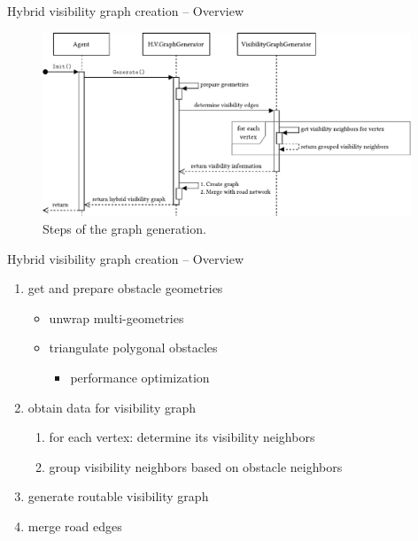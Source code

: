 \documentclass[xcolor={x11names}]{beamer}
\newenvironment{figcenter}
{%
	\parskip=0pt%
	\par%
	\nopagebreak%
	\centering%
}%
{%
	\par%
	\noindent%
	\ignorespacesafterend%
}
\begin{document}
		\begin{frame}{Hybrid visibility graph creation -- Overview}
			\begin{figure}[t]
				\begin{figcenter}
					\includegraphics[width=0.98\textwidth]{images/components-sequence-generation-short.pdf}
				\end{figcenter}
				\caption{Steps of the graph generation.}
			\end{figure}
		\end{frame}
		
		\begin{frame}{Hybrid visibility graph creation -- Overview}
			\begin{enumerate}
				\item get and prepare obstacle geometries
				\begin{itemize}
					\item unwrap multi-geometries
					\item triangulate polygonal obstacles
					\begin{itemize}
						\item[\textrightarrow] performance optimization
					\end{itemize}
				\end{itemize}
				\item obtain data for visibility graph
				\begin{enumerate}
					\item for each vertex: determine its visibility neighbors
					\item group visibility neighbors based on obstacle neighbors
				\end{enumerate}
				\item generate routable visibility graph
				\item merge road edges
			\end{enumerate}
		\end{frame}
		
\end{document}
